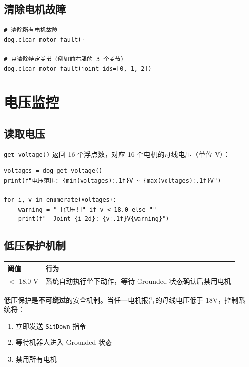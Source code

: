 \documentclass[a4paper,11pt,openany]{book}
\begin{document}
\subsection{清除电机故障}

\begin{lstlisting}[style=python]
# 清除所有电机故障
dog.clear_motor_fault()

# 只清除特定关节（例如前右腿的 3 个关节）
dog.clear_motor_fault(joint_ids=[0, 1, 2])
\end{lstlisting}

\section{电压监控}

\subsection{读取电压}

\texttt{get\_voltage()} 返回 16 个浮点数，对应 16 个电机的母线电压（单位 V）：

\begin{lstlisting}[style=python]
voltages = dog.get_voltage()
print(f"电压范围: {min(voltages):.1f}V ~ {max(voltages):.1f}V")

for i, v in enumerate(voltages):
    warning = " [低压!]" if v < 18.0 else ""
    print(f"  Joint {i:2d}: {v:.1f}V{warning}")
\end{lstlisting}

\subsection{低压保护机制}

\begin{longtable}{ll}
\toprule
阈值 & 行为 \\
\midrule
\endhead
$<$ 18.0 V & 系统自动执行坐下动作，等待 Grounded 状态确认后禁用电机 \\
\bottomrule
\end{longtable}

低压保护是\textbf{不可绕过}的安全机制。当任一电机报告的母线电压低于 18V，控制系统将：

\begin{enumerate}[nosep]
  \item 立即发送 \texttt{SitDown} 指令
  \item 等待机器人进入 Grounded 状态
  \item 禁用所有电机
\end{enumerate}
\end{document}
